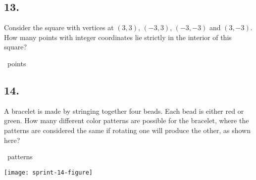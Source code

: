 \documentclass[12pt]{article}
\begin{document}
\subsection*{13.}
Consider the square with vertices at $(3,3)$, $(-3,3)$, $(-3,-3)$ and $(3,-3)$. How many points with integer coordinates lie strictly in the interior of this square?

\nopagebreak

\fbox{\phantom{ANSWER}}~points

\begin{answer}
%
\end{answer}


\subsection*{14.}
A bracelet is made by stringing together four beads. Each bead is either red or green. How many different color patterns are possible for the bracelet, where the patterns are considered the same if rotating one will produce the other, as shown here? 

\nopagebreak

\fbox{\phantom{ANSWER}}~patterns

\begin{minipagex}[b]{\linewidth}
\centering
\texttt{[image: sprint-14-figure]}
\end{minipagex}
\end{document}
